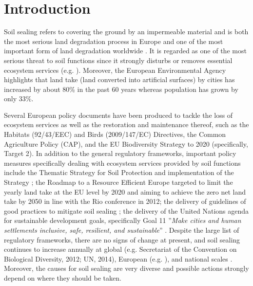 \documentclass[APA,LATO1COL,doublespace]{WileyNJD-v2}
\begin{document}
\section{Introduction}\label{sec1}
Soil sealing refers to covering the ground by an impermeable material and is both the most serious land degradation process in Europe and one of the most important form of land degradation worldwide \citep{FAO15}.
It is regarded as one of the most serious threat to soil functions since it strongly disturbs or removes essential ecosystem services (e.g. \citealp{Calzolari16,Dunbar13}).
Moreover, the European Environmental Agency \citep{EEA2011} highlights that land take (land converted into artificial surfaces) by cities has increased by about 80\% in the past 60 years whereas population has grown by only 33\%.

Several European policy documents have been produced to tackle the loss of ecosystem services as well as the restoration and maintenance thereof, such as the Habitats (92/43/EEC) and Birds (2009/147/EC) Directives, the Common Agriculture Policy (CAP), and the EU Biodiversity Strategy to 2020 (specifically, Target 2).
In addition to the general regulatory frameworks, important policy measures specifically dealing with ecosystem services provided by soil functions include the Thematic Strategy for Soil Protection \citep{EC2006} and implementation of the Strategy \citep{EC2012}; the Roadmap to a Resource Efficient Europe \citep{EC2011a} targeted to limit the yearly land take at the EU level by 2020 and aiming to achieve the zero net land take by 2050 in line with the Rio conference in 2012; the delivery of guidelines of good practices to mitigate soil sealing \citep{SWD12}; the delivery of the United Nations agenda \citep{UN15} for sustainable development goals, specifically Goal 11 ''\textit{Make cities and human settlements inclusive, safe, resilient, and sustainable}'' \citep{Keesstra16}.
Despite the large list of regulatory frameworks, there are no signs of change at present, and soil sealing continues to increase annually \citep{FAO15} at global (e.g. Secretariat of the Convention on Biological Diversity, 2012; UN, 2014), European (e.g. \citealp{SWD12}), and national scales \citep[e.g.][Copernicus Land Monitoring Service\footnote{ http://land.copernicus.eu}]{ISPRA16,ISPRA18}.
Moreover, the causes for soil sealing are very diverse and possible actions strongly depend on where they should be taken.
\end{document}
